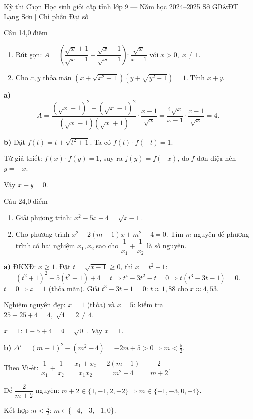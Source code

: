﻿%
%
  {Kỳ thi Chọn Học sinh giỏi cấp tỉnh lớp 9 — Năm học 2024--2025}%
  {Sở GD\&ĐT Lạng Sơn | Chỉ phần Đại số}

\begin{de_cau}{Câu 1}{4,0 điểm}
\begin{enumerate}[label=\alph*)]
\item Rút gọn: $A = \left(\dfrac{\sqrt{x}+1}{\sqrt{x}-1} - \dfrac{\sqrt{x}-1}{\sqrt{x}+1}\right) : \dfrac{\sqrt{x}}{x-1}$
với $x>0,\; x\neq 1$.
\item Cho $x,y$ thỏa mãn $\left(x+\sqrt{x^2+1}\right)\left(y+\sqrt{y^2+1}\right)=1$. Tính $x+y$.
\end{enumerate}
\end{de_cau}

\begin{loi_giai_cau}
\textbf{a)}
\[A = \frac{(\sqrt{x}+1)^2-(\sqrt{x}-1)^2}{(\sqrt{x}-1)(\sqrt{x}+1)} \cdot \frac{x-1}{\sqrt{x}}
= \frac{4\sqrt{x}}{x-1}\cdot\frac{x-1}{\sqrt{x}} = \boxed{4}.\]

\textbf{b)} Đặt $f(t)=t+\sqrt{t^2+1}$. Ta có $f(t)\cdot f(-t)=1$.

Từ giả thiết: $f(x)\cdot f(y)=1$, suy ra $f(y)=f(-x)$, do $f$ đơn điệu nên $y=-x$.

Vậy $\boxed{x+y=0}$.
\end{loi_giai_cau}

\begin{de_cau}{Câu 2}{4,0 điểm}
\begin{enumerate}[label=\alph*)]
\item Giải phương trình: $x^2 - 5x + 4 = \sqrt{x-1}$.
\item Cho phương trình $x^2 - 2(m-1)x + m^2 - 4 = 0$. Tìm $m$ nguyên để phương trình có hai nghiệm
$x_1,x_2$ sao cho $\dfrac{1}{x_1}+\dfrac{1}{x_2}$ là số nguyên.
\end{enumerate}
\end{de_cau}

\begin{loi_giai_cau}
\textbf{a)} ĐKXĐ: $x\geq 1$. Đặt $t=\sqrt{x-1}\geq 0$, thì $x=t^2+1$:
\[(t^2+1)^2 - 5(t^2+1)+4 = t \Rightarrow t^4-3t^2-t = 0 \Rightarrow t(t^3-3t-1)=0.\]
$t=0\Rightarrow x=1$ (thỏa mãn). Giải $t^3-3t-1=0$: $t\approx 1{,}88$ cho $x\approx 4{,}53$.

Nghiệm nguyên đẹp: $x=1$ (thỏa) và $x=5$: kiểm tra $25-25+4=4,\;\sqrt{4}=2\neq 4$.

$x=1$: $1-5+4=0=\sqrt{0}$ \checkmark . Vậy $\boxed{x=1}$.

\textbf{b)} $\Delta'=(m-1)^2-(m^2-4)=-2m+5>0\Rightarrow m<\frac{5}{2}$.

Theo Vi-ét: $\dfrac{1}{x_1}+\dfrac{1}{x_2}=\dfrac{x_1+x_2}{x_1x_2}=\dfrac{2(m-1)}{m^2-4}=\dfrac{2}{m+2}$.

Để $\dfrac{2}{m+2}$ nguyên: $m+2\in\{1,-1,2,-2\}\Rightarrow m\in\{-1,-3,0,-4\}$.

Kết hợp $m<\frac{5}{2}$: $\boxed{m\in\{-4,-3,-1,0\}}$.
\end{loi_giai_cau}

